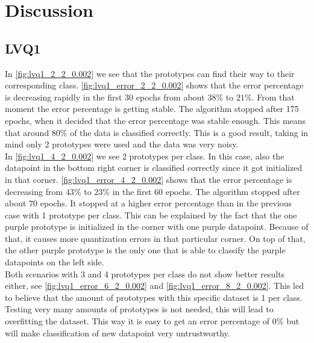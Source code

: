 \documentclass[twoside, a4paper, fleqn, reqno]{article}
\begin{document}
\section*{Discussion}

	\subsection*{LVQ1}
	In \autoref{fig:lvq1_2_2_0.002} we see that the prototypes can find their way to their corresponding class.
	\autoref{fig:lvq1_error_2_2_0.002} shows that the error percentage is decreasing rapidly in the first 30 epochs
	from about $38\%$ to $21\%$. From that moment the error percentage is getting stable. The algorithm stopped
	after 175 epochs, when it decided that the error percentage was stable enough.
	This means that around $80\%$ of the data is classified correctly. This is a good result, taking in mind
	only 2 prototypes were used and the data was very noisy.\\

	In \autoref{fig:lvq1_4_2_0.002} we see 2 prototypes per class. In this case, also the datapoint in the bottom right
	corner is classified correctly since it got initialized in that corner.
	\autoref{fig:lvq1_error_4_2_0.002} shows that the error percentage is decreasing from $43\%$ to $23\%$ in the first $60$ epochs.
	The algorithm stopped after about $70$ epochs. It stopped at a higher error percentage than in the previous case with 1 prototype per class.
	This can be explained by the fact that the one purple prototype is initialized in the corner with one purple datapoint.
	Because of that, it causes more quantization errors in that particular corner. On top of that, the other purple prototype
	is the only one that is able to classify the purple datapoints on the left side.\\

	Both scenarios with 3 and 4 prototypes per class do not show better results either,
	see \autoref{fig:lvq1_error_6_2_0.002} and \autoref{fig:lvq1_error_8_2_0.002}.
	This led to believe that the amount of prototypes with this specific dataset is 1 per class.
	Testing very many amounts of prototypes is not needed, this will lead to overfitting the dataset.
	This way it is easy to get an error percentage of $0\%$ but will make classification of new datapoint
	very untrustworthy.\\
\end{document}
